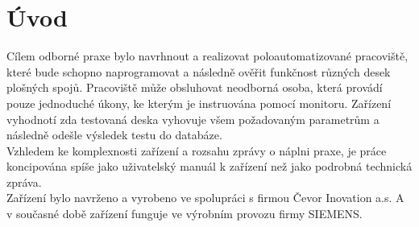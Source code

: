 \chapter*{Úvod}
{}

\indent Cílem odborné praxe bylo navrhnout a realizovat
poloautomatizované pracoviště,
které bude schopno naprogramovat a následně ověřit funkčnost
různých desek plošných spojů.
Pracoviště může obsluhovat neodborná osoba, která provádí pouze jednoduché úkony,
ke kterým je instruována pomocí monitoru. Zařízení vyhodnotí zda testovaná
deska vyhovuje všem požadovaným parametrům a následně odešle výsledek testu
do databáze.\\

Vzhledem ke komplexnosti zařízení a rozsahu zprávy o náplni praxe,
je práce koncipována spíše jako uživatelský manuál k zařízení než jako podrobná technická zpráva.\\

Zařízení bylo navrženo a vyrobeno ve spolupráci s firmou Čevor Inovation a.s. A v současné
době zařízení funguje ve výrobním provozu firmy SIEMENS.